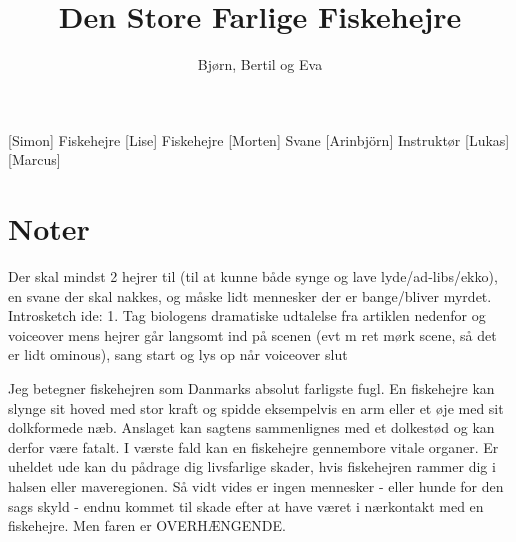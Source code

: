\documentclass[a4paper,11pt]{article}
\title{Den Store Farlige Fiskehejre}
\author{Bjørn, Bertil og Eva}
\begin{document}
\maketitle

\begin{roles}
[Simon] Fiskehejre 
[Lise] Fiskehejre
[Morten] Svane
[Arinbjörn] Instruktør
[Lukas]
[Marcus]
\end{roles} 

\section*{Noter}
Der skal mindst 2 hejrer til (til at kunne både synge og lave lyde/ad-libs/ekko), en svane der skal nakkes, og måske lidt mennesker der er bange/bliver myrdet.
Introsketch ide:
1. Tag biologens dramatiske udtalelse fra artiklen nedenfor og voiceover mens hejrer går langsomt ind på scenen (evt m ret mørk scene, så det er lidt ominous), sang start og lys op når voiceover slut
\begin{props}
\prop{}
\prop{}
\prop{}
\prop{}
\prop{}
\prop{}
\end{props}

\begin{sketch}
 Jeg betegner fiskehejren som Danmarks absolut farligste fugl. En fiskehejre kan slynge sit hoved med stor kraft og spidde eksempelvis en arm eller et øje med sit dolkformede næb. Anslaget kan sagtens sammenlignes med et dolkestød og kan derfor være fatalt. I værste fald kan en fiskehejre gennembore vitale organer. Er uheldet ude kan du pådrage dig livsfarlige skader, hvis fiskehejren rammer dig i halsen eller maveregionen. Så vidt vides er ingen mennesker - eller hunde for den sags skyld - endnu kommet til skade efter at have været i nærkontakt med en fiskehejre. Men faren er OVERHÆNGENDE.
\end{sketch}
\end{document}
